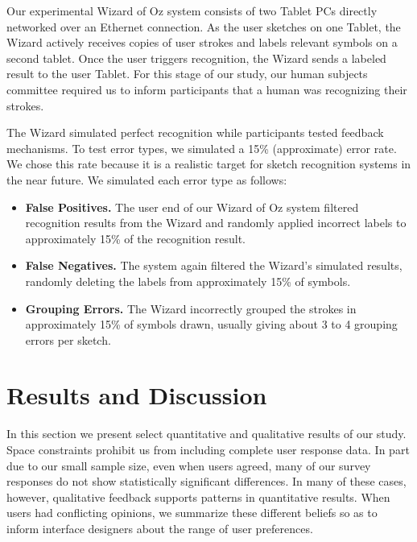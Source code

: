 \documentclass{egpubl}
\begin{document}
Our experimental Wizard of Oz system consists of two Tablet PCs directly 
networked over an Ethernet connection.  As the user sketches on one Tablet, the
Wizard actively receives copies of user strokes and labels relevant
symbols on a second tablet.  Once the user triggers recognition, the
Wizard sends a labeled result to the user Tablet.  For this stage of
our study, our human subjects committee required us to inform
participants that a human was recognizing their strokes.


The Wizard simulated perfect recognition while participants tested
feedback mechanisms.  To test error types, we simulated a 15\%
(approximate) error rate.  We chose this rate because it is a
realistic target for sketch recognition systems in the near future.  We
simulated each error type as follows:
\begin{itemize}
\item \textbf{False Positives.} The user end of our Wizard
of Oz system filtered recognition results from the Wizard and randomly
applied incorrect labels to approximately 15\% of the
recognition result.
\item \textbf{False Negatives.} The system again filtered the Wizard's simulated results,
randomly deleting the labels from approximately 15\% of symbols.
\item \textbf{Grouping Errors.}  The
Wizard incorrectly grouped the strokes in
approximately 15\% of symbols drawn, usually giving about 3 to 4
grouping errors per sketch.  
\end{itemize}


\section{Results and Discussion}
In this section we present select quantitative and qualitative results
of our study.  Space constraints prohibit us from including complete
user response data.  In part due to our small sample size, even when users
agreed, many of our survey responses do not show statistically
significant differences.  In many of these cases, however, qualitative
feedback supports patterns in quantitative results.  When users had 
conflicting opinions, we summarize these different beliefs so as to inform
interface designers about the range of user preferences.
\end{document}
